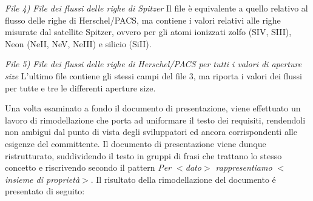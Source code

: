 \documentclass[12pt,a4paper,onecolumn,x11names]{article}
\begin{document}
\begin{flushleft}
		\textit{File 4) File dei flussi delle righe di Spitzer}\newline
		Il file è equivalente a quello relativo al flusso delle righe di Herschel/PACS, ma contiene i valori relativi alle righe misurate dal satellite Spitzer, ovvero per gli atomi ionizzati zolfo (SIV, SIII), Neon (NeII, NeV, NeIII) e silicio (SiII).\newline
		
		\textit{File 5) File dei flussi delle righe di Herschel/PACS per tutti i valori di aperture size}
		L’ultimo file contiene gli stessi campi del file 3, ma riporta i valori dei flussi per tutte e tre le differenti aperture size.\newline
	\end{flushleft}

	\begin{flushleft}
		Una volta esaminato a fondo il documento di presentazione, viene effettuato un lavoro di rimodellazione che porta ad uniformare il testo dei requisiti, rendendoli non ambigui dal punto di vista degli sviluppatori ed ancora corrispondenti alle esigenze del committente. Il documento di presentazione viene dunque ristrutturato, suddividendo il testo in gruppi di frasi che trattano lo stesso concetto e riscrivendo secondo il pattern \textit{Per $<$dato$>$ rappresentiamo $<$insieme di proprietà$>$}.\newline
		Il risultato della rimodellazione del documento \'{e} presentato di seguito:
	\end{flushleft}
	
\end{document}
